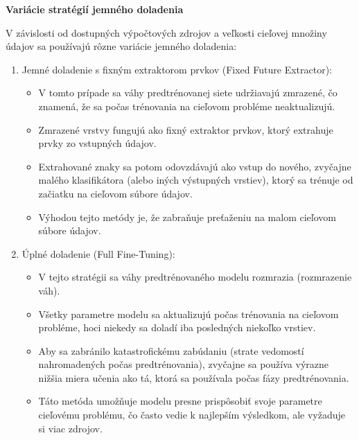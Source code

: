 \documentclass[]{tukediphc}
\begin{document}
\textbf{Variácie stratégií jemného doladenia}

V závislosti od dostupných výpočtových zdrojov a veľkosti cieľovej množiny údajov sa používajú rôzne variácie jemného doladenia:

\begin{enumerate}
\item Jemné doladenie s fixným extraktorom prvkov (Fixed Future Extractor):

\begin{itemize}
\item V tomto prípade sa váhy predtrénovanej siete udržiavajú zmrazené, čo znamená, že sa počas trénovania na cieľovom probléme neaktualizujú.

\item Zmrazené vrstvy fungujú ako fixný extraktor prvkov, ktorý extrahuje prvky zo vstupných údajov\cite{researchgate:fine_tuning_transfer_learning}.

\item Extrahované znaky sa potom odovzdávajú ako vstup do nového, zvyčajne malého klasifikátora (alebo iných výstupných vrstiev), ktorý sa trénuje od začiatku na cieľovom súbore údajov.

\item Výhodou tejto metódy je, že zabraňuje preťaženiu na malom cieľovom súbore údajov.
\end{itemize}

\item Úplné doladenie (Full Fine-Tuning):
\begin{itemize}
\item V tejto stratégii sa váhy predtrénovaného modelu rozmrazia (rozmrazenie váh).

\item Všetky parametre modelu sa aktualizujú počas trénovania na cieľovom probléme, hoci niekedy sa doladí iba posledných niekoľko vrstiev.

\item Aby sa zabránilo katastrofickému zabúdaniu (strate vedomostí nahromadených počas predtrénovania), zvyčajne sa používa výrazne nižšia miera učenia ako tá, ktorá sa používala počas fázy predtrénovania.

\item Táto metóda umožňuje modelu presne prispôsobiť svoje parametre cieľovému problému, čo často vedie k najlepším výsledkom, ale vyžaduje si viac zdrojov.
\end{itemize}
\end{enumerate}
\end{document}
